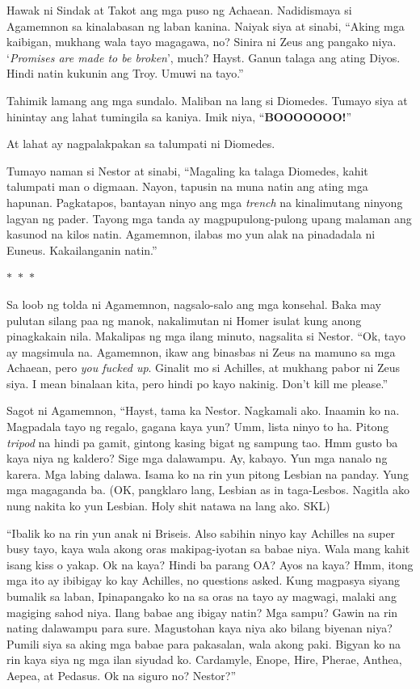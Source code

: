\documentclass[12pt,letterpaper]{report}
\newcommand{\seperate}{\begin{center}$\ast$~$\ast$~$\ast$\end{center}}
\begin{document}
Hawak ni Sindak at Takot ang mga puso ng Achaean. Nadidismaya si Agamemnon sa kinalabasan ng laban kanina. Naiyak siya at sinabi, ``Aking mga kaibigan, mukhang wala tayo magagawa, no? Sinira ni Zeus ang pangako niya. `\textit{Promises are made to be broken}', much? Hayst. Ganun talaga ang ating Diyos. Hindi natin kukunin ang Troy. Umuwi na tayo.''

Tahimik lamang ang mga sundalo. Maliban na lang si Diomedes. Tumayo siya at hinintay ang lahat tumingila sa kaniya. Imik niya, ``\textbf{BOOOOOOO!}''

At lahat ay nagpalakpakan sa talumpati ni Diomedes.

Tumayo naman si Nestor at sinabi, ``Magaling ka talaga Diomedes, kahit talumpati man o digmaan. Nayon, tapusin na muna natin ang ating mga hapunan. Pagkatapos, bantayan ninyo ang mga \textit{trench} na kinalimutang ninyong lagyan ng pader. Tayong mga tanda ay magpupulong-pulong upang malaman ang kasunod na kilos natin. Agamemnon, ilabas mo yun alak na pinadadala ni Euneus. Kakailanganin natin.''

\seperate

Sa loob ng tolda ni Agamemnon, nagsalo-salo ang mga konsehal. Baka may pulutan silang paa ng manok, nakalimutan ni Homer isulat kung anong pinagkakain nila. Makalipas ng mga ilang minuto, nagsalita si Nestor. ``Ok, tayo ay magsimula na. Agamemnon, ikaw ang binasbas ni Zeus na mamuno sa mga Achaean, pero \textit{you fucked up}. Ginalit mo si Achilles, at mukhang pabor ni Zeus siya. I mean binalaan kita, pero hindi po kayo nakinig. Don't kill me please.''

Sagot ni Agamemnon, ``Hayst, tama ka Nestor. Nagkamali ako. Inaamin ko na. Magpadala tayo ng regalo, gagana kaya yun? Umm, lista ninyo to ha. Pitong \textit{tripod} na hindi pa gamit, gintong kasing bigat ng sampung tao. Hmm gusto ba kaya niya ng kaldero? Sige mga dalawampu. Ay, kabayo. Yun mga nanalo ng karera. Mga labing dalawa. Isama ko na rin yun pitong Lesbian na panday. Yung mga magaganda ba. (OK, pangklaro lang, Lesbian as in taga-Lesbos. Nagitla ako nung nakita ko yun Lesbian. Holy shit natawa na lang ako. SKL)

``Ibalik ko na rin yun anak ni Briseis. Also sabihin ninyo kay Achilles na super busy tayo, kaya wala akong oras makipag-iyotan sa babae niya. Wala mang kahit isang kiss o yakap. Ok na kaya? Hindi ba parang OA? Ayos na kaya? Hmm, itong mga ito ay ibibigay ko kay Achilles, no questions asked. Kung magpasya siyang bumalik sa laban, Ipinapangako ko na sa oras na tayo ay magwagi, malaki ang magiging sahod niya. Ilang babae ang ibigay natin? Mga sampu? Gawin na rin nating dalawampu para sure. Magustohan kaya niya ako bilang biyenan niya? Pumili siya sa aking mga babae para pakasalan, wala akong paki. Bigyan ko na rin kaya siya ng mga ilan siyudad ko. Cardamyle, Enope, Hire, Pherae, Anthea, Aepea, at Pedasus. Ok na siguro no? Nestor?''
\end{document}
